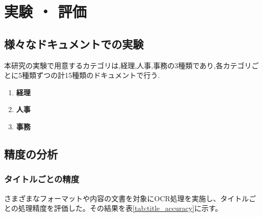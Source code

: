 \chapter{実験 ・ 評価}
\label{ch:exp}
\quad

\section{様々なドキュメントでの実験}
\label{sec:exp_doc}

本研究の実験で用意するカテゴリは,経理,人事,事務の3種類であり,各カテゴリごとに5種類ずつの計15種類のドキュメントで行う.
\begin{enumerate}
    \item \textbf{経理}
    \item \textbf{人事}
    \item \textbf{事務}
\end{enumerate}

\section{精度の分析}
\label{sec:exp_anal}

\subsection{タイトルごとの精度}
\label{subsec:title}

さまざまなフォーマットや内容の文書を対象にOCR処理を実施し、タイトルごとの処理精度を評価した。その結果を表\ref{tab:title_accuracy}に示す。

